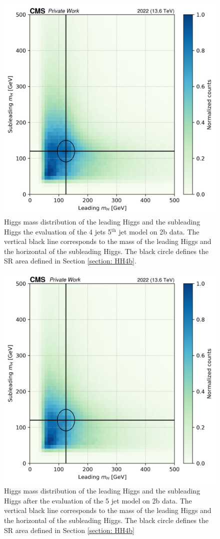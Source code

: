 \begin{figure}[hbt]
    \centering
    \includegraphics[width=0.6\linewidth]{Images/6.Improving/Mass sculpting/mass sculpting 4j5g.png}
    \caption{Higgs mass distribution of the leading Higgs and the subleading Higgs the evaluation of the 4 jets 5$^{\text{th}}$ jet model on 2b data. The vertical black line corresponds to the mass of the leading Higgs and the horizontal of the subleading Higgs. The black circle defines the SR area defined in Section \ref{section: HH4b}.}
    \label{fig: 2D mass sculpting for 4j5g}
\end{figure}



\begin{figure}[hbt]
    \centering
    \includegraphics[width=0.6\linewidth]{Images/6.Improving/Mass sculpting/mass sculptimg 5j.png}
    \caption{Higgs mass distribution of the leading Higgs and the subleading Higgs after the evaluation of the 5 jet model on 2b data. The vertical black line corresponds to the mass of the leading Higgs and the horizontal of the subleading Higgs. The black circle defines the SR area defined in Section \ref{section: HH4b}}
    \label{fig: 2D mass sculpting for 5j}
\end{figure}



